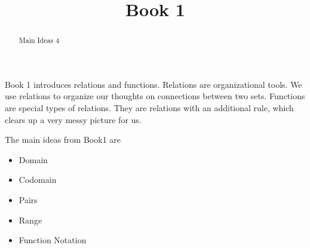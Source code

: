 \documentclass{ximera}
\title{Book 1}
\begin{document}
\begin{abstract}
Main Ideas 4
\end{abstract}

\maketitle

\begin{sectionOutcomes}

Book 1 introduces relations and functions. Relations are organizational tools.  We use relations to organize our thoughts on connections between two sets. Functions are special types of relations.  They are relations with an additional rule, which clears up a very messy picture for us. 

The main ideas from Book1 are

\begin{itemize}
\item Domain 
\item Codomain
\item Pairs
\item Range
\item Function Notation
\end{itemize}

\end{sectionOutcomes}
\end{document}
